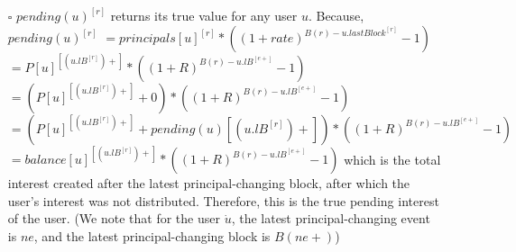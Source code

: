 \documentclass{article}
\begin{document}
\begin{itemize}
\begin{itemize}
    \item[$\square$] { $ pending(u)^{[r]}$ returns its true value for any user $u$.}
    \newline \newline
    Because, $ pending(u)^{[r]}$
    \newline \newline
    $ = principals[u]^{[r]} * ((1+rate) ^ {B(r)-u.lastBlock^{[r]}}-1)$
    \newline \newline
    $ = P[u]^{[(u.lB^{[r]})+]} * ((1+R) ^ {B(r)-u.lB^{[e+]}}-1)$
    \newline \newline
    $ = (P[u]^{[(u.lB^{[r]})+]} + 0) * ((1+R) ^ {B(r)-u.lB^{[e+]}}-1)$
    \newline \newline
    $ = (P[u]^{[(u.lB^{[r]})+]} + pending(u){[(u.lB^{[r]})+]}) * ((1+R) ^ {B(r)-u.lB^{[e+]}}-1)$
    \newline \newline
    $ = balance[u]^{[(u.lB^{[r]})+]} * ((1+R) ^ {B(r)-u.lB^{[e+]}}-1)$
    \newline \newline
    which is the total interest created after the latest principal-changing block,
    after which the user's interest was not distributed. Therefore, this is the true 
    pending interest of the user. 
    (We note that for the user $\dot u$, the latest principal-changing event is $ne$, 
    and the latest principal-changing block is $B(ne+)$)


\end{itemize}
\end{itemize}
\end{document}
